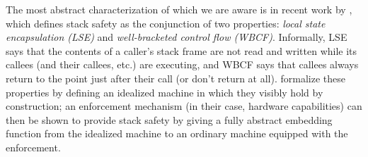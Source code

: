 \documentclass[acmsmall,review,anonymous]{acmart}\settopmatter{printfolios=true,printccs=false,printacmref=false}
\begin{document}
The most abstract characterization of which we are aware is in
recent work by \citet{Skorstengaard+19}, which defines stack safety as the conjunction of two
properties:
{\em local state encapsulation (LSE)} and {\em well-bracketed control flow (WBCF)}.
Informally, LSE says that the contents of
a caller's stack frame are not read and written while its callees (and their callees, etc.) are
executing, and WBCF says that callees always
return to the point just after their call (or don't return at all).
\citet{Skorstengaard+19} formalize these properties by defining an idealized machine
in which they visibly hold by construction; an enforcement mechanism (in their case, hardware
capabilities)
can then be shown to provide stack safety by giving a fully abstract embedding function
from the idealized machine to an ordinary machine equipped with the enforcement.
\end{document}

